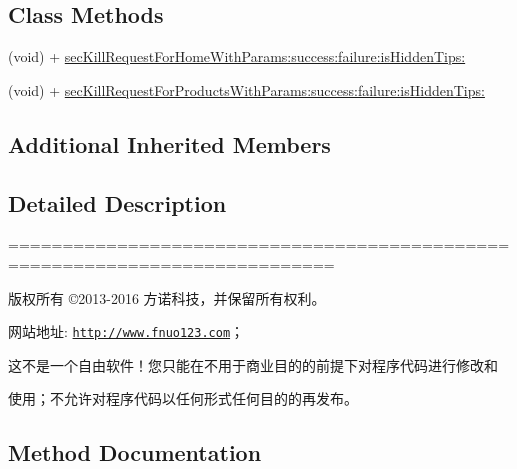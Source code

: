 \subsection*{Class Methods}
\begin{DoxyCompactItemize}
\item 
(void) + \mbox{\hyperlink{interface_f_n_seckill_data_request_tool_af2318d2f7ff694880ca2345f0410bfd9}{sec\+Kill\+Request\+For\+Home\+With\+Params\+:success\+:failure\+:is\+Hidden\+Tips\+:}}
\item 
(void) + \mbox{\hyperlink{interface_f_n_seckill_data_request_tool_a31e85a37ef22f97980e47bc81980af23}{sec\+Kill\+Request\+For\+Products\+With\+Params\+:success\+:failure\+:is\+Hidden\+Tips\+:}}
\end{DoxyCompactItemize}
\subsection*{Additional Inherited Members}


\subsection{Detailed Description}
============================================================================

版权所有 ©2013-\/2016 方诺科技，并保留所有权利。

网站地址\+: \href{http://www.fnuo123.com}{\tt http\+://www.\+fnuo123.\+com}； 



这不是一个自由软件！您只能在不用于商业目的的前提下对程序代码进行修改和

使用；不允许对程序代码以任何形式任何目的的再发布。 

 

\subsection{Method Documentation}
\mbox{\label{interface_f_n_seckill_data_request_tool_af2318d2f7ff694880ca2345f0410bfd9}} 
